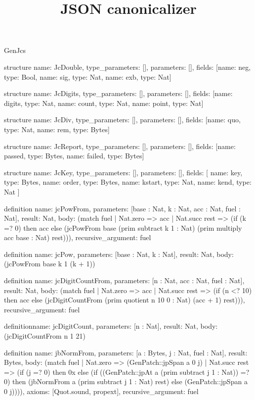 \begin{lexlean}{GenJcs}
\title{JSON canonicalizer}
\begin{semanticmodule}
structure{
  name: JcDouble,
  type_parameters: [],
  parameters: [],
  fields: [{name: neg, type: Bool}, {name: sig, type: Nat}, {name: exb, type: Nat}]
}

structure{
  name: JcDigits,
  type_parameters: [],
  parameters: [],
  fields: [{name: digits, type: Nat}, {name: count, type: Nat}, {name: point, type: Nat}]
}

structure{
  name: JcDiv,
  type_parameters: [],
  parameters: [],
  fields: [{name: quo, type: Nat}, {name: rem, type: Bytes}]
}

structure{
  name: JcReport,
  type_parameters: [],
  parameters: [],
  fields: [{name: passed, type: Bytes}, {name: failed, type: Bytes}]
}

structure{
  name: JcKey,
  type_parameters: [],
  parameters: [],
  fields: [
    {name: key, type: Bytes},
    {name: order, type: Bytes},
    {name: kstart, type: Nat},
    {name: kend, type: Nat}
  ]
}

definition{
  name: jcPowFrom,
  parameters: [base : Nat, k : Nat, acc : Nat, fuel : Nat],
  result: Nat,
  body: (match fuel
    | Nat.zero => acc
    | Nat.succ rest => (if (k =? 0) then acc else (jcPowFrom base (prim subtract k 1 : Nat) (prim multiply acc base : Nat) rest))),
  recursive_argument: fuel
}

definition{
  name: jcPow,
  parameters: [base : Nat, k : Nat],
  result: Nat,
  body: (jcPowFrom base k 1 (k + 1))
}

definition{
  name: jcDigitCountFrom,
  parameters: [n : Nat, acc : Nat, fuel : Nat],
  result: Nat,
  body: (match fuel
    | Nat.zero => acc
    | Nat.succ rest => (if (n <? 10) then acc else (jcDigitCountFrom (prim quotient n 10 0 : Nat) (acc + 1) rest))),
  recursive_argument: fuel
}

definition{name: jcDigitCount, parameters: [n : Nat], result: Nat, body: (jcDigitCountFrom n 1 21)}

definition{
  name: jbNormFrom,
  parameters: [a : Bytes, j : Nat, fuel : Nat],
  result: Bytes,
  body: (match fuel
    | Nat.zero => (GenPatch::jpSpan a 0 j)
    | Nat.succ rest => (if (j =? 0) then 0x else (if ((GenPatch::jpAt a (prim subtract j 1 : Nat)) =? 0) then (jbNormFrom a (prim subtract j 1 : Nat) rest) else (GenPatch::jpSpan a 0 j)))),
  axioms: [Quot.sound, propext],
  recursive_argument: fuel
}


\end{semanticmodule}
\end{lexlean}
